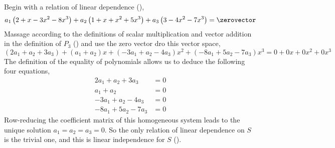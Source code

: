Begin with a relation of linear dependence (),
%
\begin{equation*}
a_1\left(2 +x -3x^2 -8x^3\right)+a_2\left(1+ x + x^2 +5x^3\right)+a_3\left(3 -4x^2 -7x^3\right)=\zerovector
\end{equation*}
%
Massage according to the definitions of scalar multiplication and vector addition in the definition of $P_3$ () and use the zero vector dro this vector space,
%
\begin{equation*}
\left(2a_1+a_2+3a_3\right)+
\left(a_1+a_2\right)x+
\left(-3a_1+a_2-4a_3\right)x^2+
\left(-8a_1+5a_2-7a_3\right)x^3
=0+0x+0x^2+0x^3
\end{equation*}
%
The definition of the equality of polynomials allows us to deduce the following four equations,
%
\begin{align*}
2a_1+a_2+3a_3&=0\\
a_1+a_2&=0\\
-3a_1+a_2-4a_3&=0\\
-8a_1+5a_2-7a_3&=0
\end{align*}
%
Row-reducing the coefficient matrix of this homogeneous system leads to the unique solution $a_1=a_2=a_3=0$.  So the only relation of linear dependence on $S$ is the trivial one, and this is linear independence for $S$ ().
